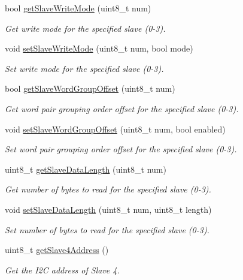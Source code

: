 \begin{DoxyCompactItemize}
bool \mbox{\hyperlink{classMPU6050_adb99955fa66300b1f0bedfcdd8187412}{get\+Slave\+Write\+Mode}} (uint8\+\_\+t num)
\begin{DoxyCompactList}\small\item\em Get write mode for the specified slave (0-\/3). \end{DoxyCompactList}\item 
void \mbox{\hyperlink{classMPU6050_a3d9bfcb5394c7a382009cd2dc91ce801}{set\+Slave\+Write\+Mode}} (uint8\+\_\+t num, bool mode)
\begin{DoxyCompactList}\small\item\em Set write mode for the specified slave (0-\/3). \end{DoxyCompactList}\item 
bool \mbox{\hyperlink{classMPU6050_a32ce8023bb80afc5d55811de70c7214f}{get\+Slave\+Word\+Group\+Offset}} (uint8\+\_\+t num)
\begin{DoxyCompactList}\small\item\em Get word pair grouping order offset for the specified slave (0-\/3). \end{DoxyCompactList}\item 
void \mbox{\hyperlink{classMPU6050_a32602ab86f70b70d3313628fc6c010ae}{set\+Slave\+Word\+Group\+Offset}} (uint8\+\_\+t num, bool enabled)
\begin{DoxyCompactList}\small\item\em Set word pair grouping order offset for the specified slave (0-\/3). \end{DoxyCompactList}\item 
uint8\+\_\+t \mbox{\hyperlink{classMPU6050_a54c2a48b3cb79106bcaf75accf6cd311}{get\+Slave\+Data\+Length}} (uint8\+\_\+t num)
\begin{DoxyCompactList}\small\item\em Get number of bytes to read for the specified slave (0-\/3). \end{DoxyCompactList}\item 
void \mbox{\hyperlink{classMPU6050_ab4151353f433c533246d938fc3b78458}{set\+Slave\+Data\+Length}} (uint8\+\_\+t num, uint8\+\_\+t length)
\begin{DoxyCompactList}\small\item\em Set number of bytes to read for the specified slave (0-\/3). \end{DoxyCompactList}\item 
uint8\+\_\+t \mbox{\hyperlink{classMPU6050_a4278dec5fec25be9a6f45b51a3373ad2}{get\+Slave4\+Address}} ()
\begin{DoxyCompactList}\small\item\em Get the I2C address of Slave 4. \end{DoxyCompactList}\item 

\end{DoxyCompactItemize}
